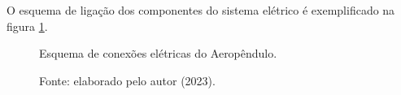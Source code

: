 O esquema de ligação dos componentes do sistema elétrico é exemplificado na figura \ref{fig3:image_12}.

\begin{figure}[!h]
	\centering
    	\caption{Esquema de conexões elétricas do Aeropêndulo.}
	\caption*{Fonte: elaborado pelo autor (2023).}
	\label{fig3:image_12}
\end{figure}

\vspace{2cm}
